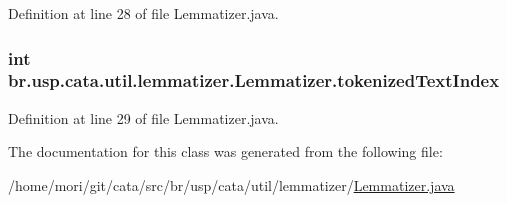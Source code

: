 Definition at line 28 of file Lemmatizer.\+java.

\hypertarget{classbr_1_1usp_1_1cata_1_1util_1_1lemmatizer_1_1_lemmatizer_ae0ae785b2feef21dc85f05d87a0e4662}{
\subsubsection[{tokenized\+Text\+Index}]{\setlength{\rightskip}{0pt plus 5cm}int br.\+usp.\+cata.\+util.\+lemmatizer.\+Lemmatizer.\+tokenized\+Text\+Index\hspace{0.3cm}{\ttfamily [private]}}}\label{classbr_1_1usp_1_1cata_1_1util_1_1lemmatizer_1_1_lemmatizer_ae0ae785b2feef21dc85f05d87a0e4662}


Definition at line 29 of file Lemmatizer.\+java.



The documentation for this class was generated from the following file\+:\begin{DoxyCompactItemize}
\item 
/home/mori/git/cata/src/br/usp/cata/util/lemmatizer/\hyperlink{_lemmatizer_8java}{Lemmatizer.\+java}\end{DoxyCompactItemize}
